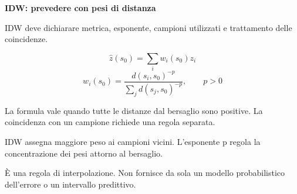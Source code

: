 \documentclass[12pt,aspectratio=1610]{beamer}
\newcommand{\PBody}[1]{\par{\fontsize{11.3}{14.8}\selectfont #1\par}}
\newcommand{\PSmall}[1]{\par{\fontsize{9.8}{13.1}\selectfont #1\par}}
\newcommand{\PInfo}[1]{%
\begin{tcolorbox}[enhanced,arc=1.6mm,boxrule=.55pt,colback=GeoTint,
 colframe=Rule!80!Classical,left=2.3mm,right=2.3mm,top=2mm,bottom=2mm,
 before skip=1mm,after skip=1mm]
\PSmall{#1}\end{tcolorbox}}
\begin{document}
\begin{frame}[plain]\hypertarget{slide92}{}
\begin{lrbox}{\TitleBox}
\begin{minipage}[t]{17.7cm}\raggedright\color{Ink}\fontsize{11.3}{14.8}\selectfont
\color{Navy}\bfseries\fontsize{20.6}{24.5}\selectfont IDW: prevedere con pesi di distanza
\end{minipage}\end{lrbox}

\begin{lrbox}{\RecallBox}
\begin{minipage}[t]{14.3cm}\raggedright\color{Ink}\fontsize{11.3}{14.8}\selectfont
\fontsize{10.3}{13.8}\selectfont IDW deve dichiarare metrica, esponente, campioni utilizzati e trattamento delle coincidenze.
\end{minipage}\end{lrbox}

\begin{lrbox}{\PilotLeftBox}
\begin{minipage}[t]{10.05cm}\raggedright\color{Ink}\fontsize{11.3}{14.8}\selectfont
\[\widehat z(s_0)=\sum_iw_i(s_0)z_i\]
\[w_i(s_0)=\frac{d(s_i,s_0)^{-p}}{\sum_jd(s_j,s_0)^{-p}},\qquad p>0\]
\PInfo{La formula vale quando tutte le distanze dal bersaglio sono positive. La coincidenza con un campione richiede una regola separata.}

\end{minipage}\end{lrbox}

\begin{lrbox}{\PilotRightBox}
\begin{minipage}[t]{7.55cm}\raggedright\color{Ink}\fontsize{11.3}{14.8}\selectfont
\PBody{IDW assegna maggiore peso ai campioni vicini. L’esponente p regola la concentrazione dei pesi attorno al bersaglio.}
\vspace{2.5mm}
\PBody{È una regola di interpolazione. Non fornisce da sola un modello probabilistico dell’errore o un intervallo predittivo.}
\vspace{2.5mm}

\end{minipage}\end{lrbox}


\end{frame}
\end{document}
